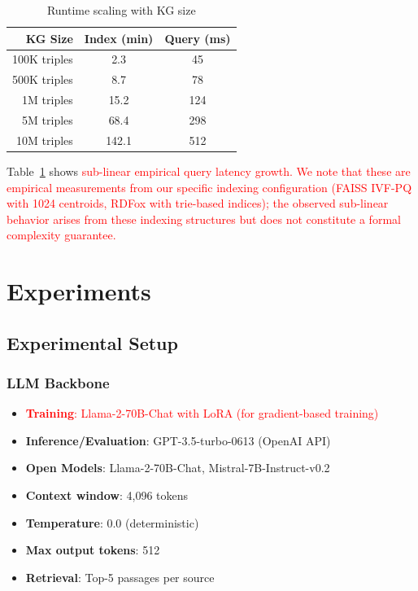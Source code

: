 \documentclass[10pt,twocolumn]{article}
\newcommand{\revisioncritical}[1]{\textcolor{red}{#1}}
\begin{document}
\begin{table}[t]
\centering
\caption{Runtime scaling with KG size}
\label{tab:scale}
\small
\begin{tabular}{@{}rcc@{}}
\toprule
\textbf{KG Size} & \textbf{Index (min)} & \textbf{Query (ms)} \\
\midrule
100K triples & 2.3 & 45 \\
500K triples & 8.7 & 78 \\
1M triples & 15.2 & 124 \\
5M triples & 68.4 & 298 \\
10M triples & 142.1 & 512 \\
\bottomrule
\end{tabular}
\end{table}

Table~\ref{tab:scale} shows \revisioncritical{sub-linear empirical query latency growth. We note that these are empirical measurements from our specific indexing configuration (FAISS IVF-PQ with 1024 centroids, RDFox with trie-based indices); the observed sub-linear behavior arises from these indexing structures but does not constitute a formal complexity guarantee.}

\section{Experiments}
\label{sec:experiments}

\subsection{Experimental Setup}

\subsubsection{LLM Backbone}
\begin{itemize}
    \item \revisioncritical{\textbf{Training}: Llama-2-70B-Chat with LoRA (for gradient-based training)}
    \item \textbf{Inference/Evaluation}: GPT-3.5-turbo-0613 (OpenAI API)
    \item \textbf{Open Models}: Llama-2-70B-Chat, Mistral-7B-Instruct-v0.2
    \item \textbf{Context window}: 4,096 tokens
    \item \textbf{Temperature}: 0.0 (deterministic)
    \item \textbf{Max output tokens}: 512
    \item \textbf{Retrieval}: Top-5 passages per source
\end{itemize}
\end{document}
